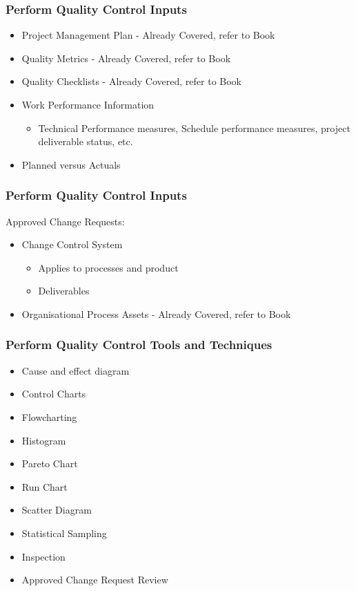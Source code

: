 \begin{frame}
\frametitle{Perform Quality Control \hfill Inputs}
\begin{itemize}
	\item Project Management Plan - Already Covered, refer to Book
	\item Quality Metrics - Already Covered, refer to Book
	\item Quality Checklists - Already Covered, refer to Book
	\item Work Performance Information
		\begin{itemize}
			\item Technical Performance measures, Schedule performance measures, project deliverable status, etc.
		\end{itemize}
	\item Planned versus Actuals
\end{itemize}
\end{frame}




\begin{frame}
\frametitle{Perform Quality Control \hfill Inputs}
Approved Change Requests:\\
\begin{itemize}
\item Change Control System
	\begin{itemize}
		\item Applies to processes and product
		\item Deliverables
	\end{itemize}
\item Organisational Process Assets - Already Covered, refer to Book
\end{itemize}
\end{frame}




\begin{frame}
\frametitle{Perform Quality Control \hfill Tools and Techniques}
\begin{itemize}
	\item Cause and effect diagram
	\item Control Charts
	\item Flowcharting
	\item Histogram
	\item Pareto Chart
	\item Run Chart
	\item Scatter Diagram
	\item Statistical Sampling
	\item Inspection
	\item Approved Change Request Review
\end{itemize}
\end{frame}




